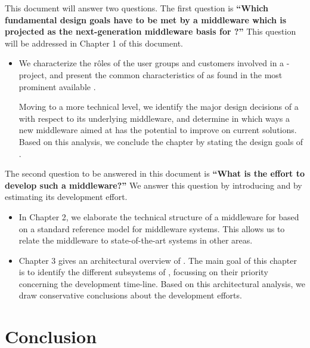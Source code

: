 \documentclass[a4paper, 10pt]{book}
\begin{document}
This document will answer two questions. The first question is
\textbf{``Which fundamental design goals have to be met by a
middleware which is projected as the next-generation middleware
basis for \MMORGS?''} This question will be addressed in Chapter 1 
of this document.
\begin{itemize}
    \item  We characterize the r\^{o}les of the user groups and customers 
        involved in a \MMORG-project, and present the common characteristics of
        \MMORGS as found in the most prominent available \MMORGS.

        Moving to a more technical level, we identify the major design decisions of a
        \MMORG with respect to its underlying middleware, and determine in which 
        ways a new middleware aimed at \MMORGS has the potential to improve on
        current solutions. Based on this analysis, we conclude the chapter by 
        stating the design goals of \SYNEIGHT.
\end{itemize}
%
The second question to be answered in this document is \textbf{``What
is the effort to develop such a middleware?''} We answer this
question by introducing \SYNEIGHT and by estimating its development
effort. 
\begin{itemize}
    \item In Chapter 2, we elaborate the technical structure of a
        middleware for \MMORGS based on a standard reference model for middleware
        systems. This allows us to relate the \MMORG middleware to state-of-the-art
        systems in other areas.
    \item Chapter 3 gives an architectural overview of
        \SYNEIGHT. The main goal of this chapter is to identify the
        different subsystems of \SYNEIGHT, focussing on their
        priority concerning the development time-line. 
        Based on this architectural analysis, we draw conservative
        conclusions about the development efforts.
\end{itemize}
%

\bigskip


\section*{Conclusion}
\end{document}
